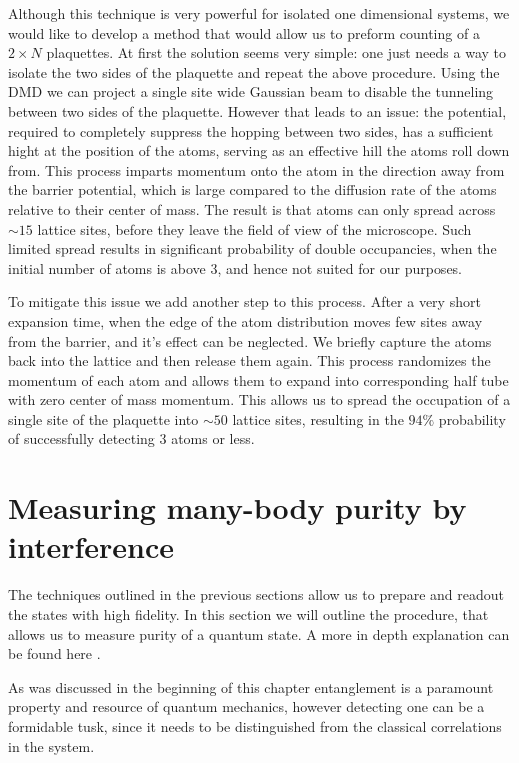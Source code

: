  Although this technique is very powerful for isolated one dimensional systems, we would like to develop a method that would allow us to preform counting of a $2\times N$ plaquettes. At first the solution seems very simple: one just needs a way to isolate the two sides of the plaquette and repeat the above procedure. Using the DMD we can project a single site wide Gaussian beam to disable the tunneling between two sides of the plaquette. However that leads to an issue: the potential, required to completely suppress the hopping between two sides, has a sufficient hight at the position of the atoms, serving as an effective hill the atoms roll down from. This process imparts momentum onto the atom in the direction away from the barrier potential, which is large compared to the diffusion rate of the atoms relative to their center of mass. The result is that atoms can only spread across $\sim 15$ lattice sites, before they leave the field of view of the microscope. Such limited spread results in significant probability of double occupancies, when the initial number of atoms is above $3$, and hence not suited for our purposes.
 
 To mitigate this issue we add another step to this process. After a very short expansion time, when the edge of the atom distribution moves few sites away from the barrier, and it's effect can be neglected. We briefly capture the atoms back into the lattice and then release them again. This process randomizes the momentum of each atom and allows them to expand into corresponding half tube with zero center of mass momentum. This allows us to spread the occupation of a single site of the plaquette into $\sim 50$ lattice sites, resulting in the $94\%$ probability of successfully detecting $3$ atoms or less.
 
 \section{Measuring many-body purity by interference}
 The techniques outlined in the previous sections allow us to prepare and readout the states with high fidelity. In this section we will outline the procedure, that allows us to measure purity of a quantum state. A more in depth explanation can be found here \cite{preiss thesis}.
 
 As was discussed in the beginning of this chapter entanglement is a paramount property and resource of quantum mechanics, however detecting one can be a formidable tusk, since it needs to be distinguished from the classical correlations in the system.